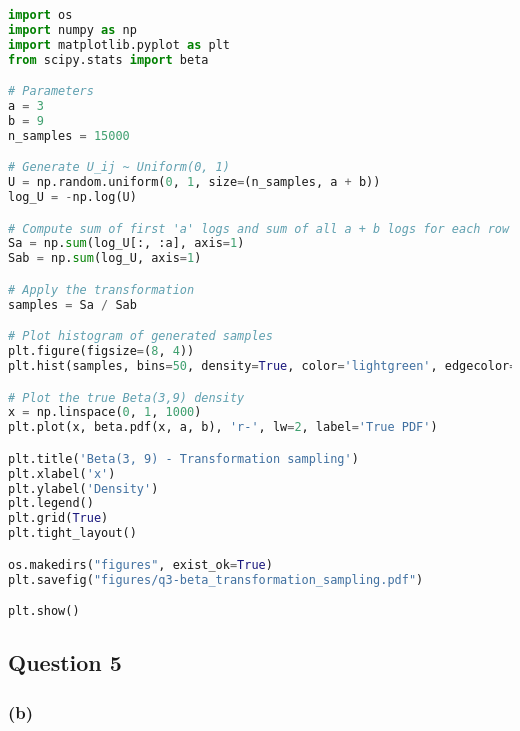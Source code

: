 \begin{lstlisting}[language=Python]
import os
import numpy as np
import matplotlib.pyplot as plt
from scipy.stats import beta

# Parameters
a = 3
b = 9
n_samples = 15000

# Generate U_ij ~ Uniform(0, 1)
U = np.random.uniform(0, 1, size=(n_samples, a + b))
log_U = -np.log(U)

# Compute sum of first 'a' logs and sum of all a + b logs for each row
Sa = np.sum(log_U[:, :a], axis=1)
Sab = np.sum(log_U, axis=1)

# Apply the transformation
samples = Sa / Sab

# Plot histogram of generated samples
plt.figure(figsize=(8, 4))
plt.hist(samples, bins=50, density=True, color='lightgreen', edgecolor='black', alpha=0.7, label='Simulated (Transformation)')

# Plot the true Beta(3,9) density
x = np.linspace(0, 1, 1000)
plt.plot(x, beta.pdf(x, a, b), 'r-', lw=2, label='True PDF')

plt.title('Beta(3, 9) - Transformation sampling')
plt.xlabel('x')
plt.ylabel('Density')
plt.legend()
plt.grid(True)
plt.tight_layout()

os.makedirs("figures", exist_ok=True)
plt.savefig("figures/q3-beta_transformation_sampling.pdf")

plt.show()
\end{lstlisting}


\newpage
\subsection{Question 5}

\subsubsection*{(b)}

